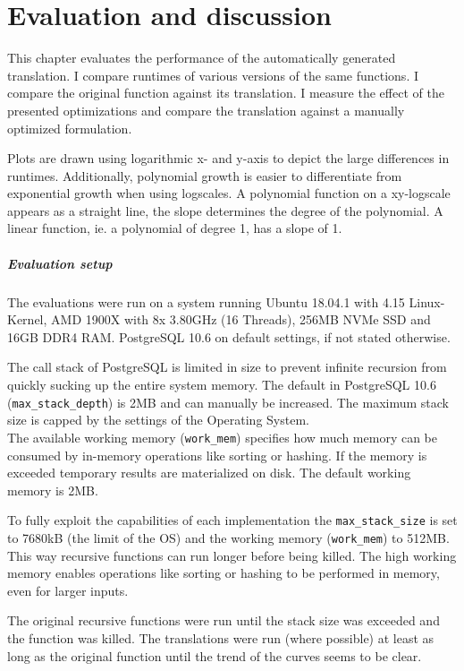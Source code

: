 \chapter{Evaluation and discussion}\label{chapter:evaluation}

This chapter evaluates the performance of the automatically generated translation. I compare runtimes of various versions of the same functions. I compare the original function against its translation. I measure the effect of the presented optimizations and compare the translation against a manually optimized formulation.

Plots are drawn using logarithmic x- and y-axis to depict the large differences in runtimes. Additionally, polynomial growth is easier to differentiate from exponential growth when using logscales. A polynomial function on a xy-logscale appears as a straight line, the slope determines the degree of the polynomial. A linear function, ie. a polynomial of degree 1, has a slope of 1.

\paragraph*{Evaluation setup}
The evaluations were run on a system running Ubuntu 18.04.1 with 4.15 Linux-Kernel, AMD 1900X with 8x 3.80GHz (16 Threads), 256MB NVMe SSD and 16GB DDR4 RAM. PostgreSQL 10.6 on default settings, if not stated otherwise.

The call stack of PostgreSQL is limited in size to prevent infinite recursion from quickly sucking up the entire system memory. The default in PostgreSQL 10.6 (\texttt{max\_stack\_depth}) is 2MB and can manually be increased. The maximum stack size is capped by the settings of the Operating System.\\
The available working memory (\texttt{work\_mem}) specifies how much memory can be consumed by in-memory operations like sorting or hashing. If the memory is exceeded temporary results are materialized on disk. The default working memory is 2MB. \cite[p. 512 ff.]{psql}

To fully exploit the capabilities of each implementation the \texttt{max\_stack\_size} is set to 7680kB (the limit of the OS) and the working memory (\texttt{work\_mem}) to 512MB. This way recursive functions can run longer before being killed. The high working memory enables operations like sorting or hashing to be performed in memory, even for larger inputs.

The original recursive functions were run until the stack size was exceeded and the function was killed. The translations were run (where possible) at least as long as the original function until the trend of the curves seems to be clear.

